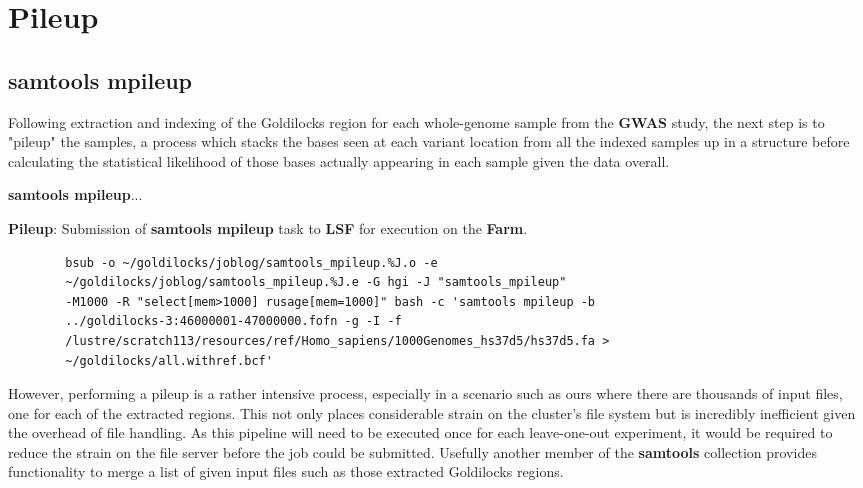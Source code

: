 \section{Pileup}
\subsection{samtools mpileup}

Following extraction and indexing of the Goldilocks region for each whole-genome
sample from the \textbf{GWAS} study, the next step is to "pileup" the samples,
a process which stacks the bases seen at each variant location from all the
indexed samples up in a structure before calculating the statistical likelihood
of those bases actually appearing in each sample given the data overall.


\textbf{samtools mpileup}\citep{samtools-mpileup}...


\begin{listing}[H]
    \caption[syn-mpileup]{\textbf{Pileup}: Submission of
        \textbf{samtools mpileup}\citep{samtools-mpileup} task to \textbf{LSF}
        for execution on the \textbf{Farm}.}
    \label{list:syn-mpileup}
    \begin{verbatim}
        bsub -o ~/goldilocks/joblog/samtools_mpileup.%J.o -e
        ~/goldilocks/joblog/samtools_mpileup.%J.e -G hgi -J "samtools_mpileup"
        -M1000 -R "select[mem>1000] rusage[mem=1000]" bash -c 'samtools mpileup -b
        ../goldilocks-3:46000001-47000000.fofn -g -I -f
        /lustre/scratch113/resources/ref/Homo_sapiens/1000Genomes_hs37d5/hs37d5.fa >
        ~/goldilocks/all.withref.bcf'
    \end{verbatim}
\end{listing}

However, performing a pileup is a rather intensive process, especially in a
scenario such as ours where there are thousands of input files, one for each of
the extracted regions. This not only places considerable strain on the cluster's
file system but is incredibly inefficient given the overhead of file handling.
As this pipeline will need to be executed once for each leave-one-out
experiment, it would be required to reduce the strain on the file server before
the job could be submitted. Usefully another member of the \textbf{samtools}
collection provides functionality to merge a list of given input files such as
those extracted Goldilocks regions.


